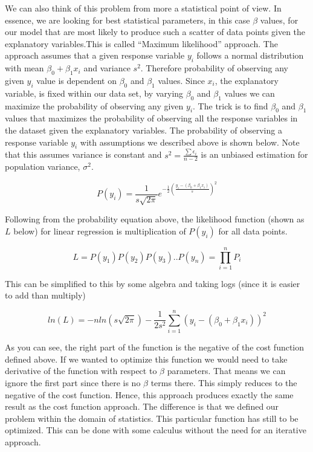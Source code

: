 \documentclass[12pt,]{krantz}
\begin{document}
We can also think of this problem from more a statistical point of view. In
essence, we are looking for best statistical parameters, in this
case \(\beta\) values, for our model that are most likely to produce such a
scatter of data points given the explanatory variables.This is called
``Maximum likelihood'' approach. The approach assumes that a given response variable \(y_i\) follows a normal distribution with mean \(\beta_0+\beta_1x_i\) and variance \(s^2\). Therefore probability of observing any given \(y_i\) value is dependent on \(\beta_0\) and \(\beta_1\) values. Since \(x_i\), the explanatory variable, is fixed within our data set, by varying \(\beta_0\) and \(\beta_1\) values we can maximize the probability of observing any given \(y_i\). The trick is to find \(\beta_0\) and \(\beta_1\) values that maximizes the probability of observing all the response variables in the dataset given the explanatory variables. The probability of observing a response variable \(y_i\) with assumptions we described above is shown below. Note that this assumes variance is constant and \(s^2=\frac{\sum{\epsilon_i}}{n-2}\) is an unbiased estimation for population variance, \(\sigma^2\).

\[P(y_{i})=\frac{1}{s\sqrt{2\pi} }e^{-\frac{1}{2}\left(\frac{y_i-(\beta_0 + \beta_1x_i)}{s}\right)^2}\]

Following from the probability equation above, the likelihood function (shown as \(L\) below) for
linear regression is multiplication of \(P(y_{i})\) for all data points.

\[L=P(y_1)P(y_2)P(y_3)..P(y_n)=\prod\limits_{i=1}^n{P_i}\]

This can be simplified to this by some algebra and taking logs (since it is
easier to add than multiply)

\[ln(L) = -nln(s\sqrt{2\pi}) - \frac{1}{2s^2} \sum\limits_{i=1}^n{(y_i-(\beta_0 + \beta_1x_i))^2} \]

As you can see, the right part of the function is the negative of the cost function
defined above. If we wanted to optimize this function we would need to take derivative of
the function with respect to \(\beta\) parameters. That means we can ignore the
first part since there is no \(\beta\) terms there. This simply reduces to the
negative of the cost function. Hence, this approach produces exactly the same
result as the cost function approach. The difference is that we defined our
problem
within the domain of statistics. This particular function has still to be optimized. This can be done with some calculus without the need for an
iterative approach.
\end{document}

